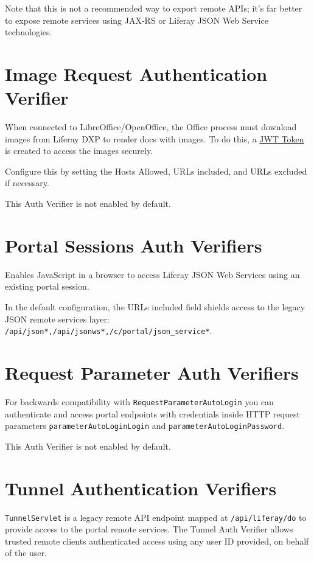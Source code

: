 Note that this is not a recommended way to export remote APIs; it's far
better to expose remote services using JAX-RS or Liferay JSON Web
Service technologies.

\section{Image Request Authentication
Verifier}\label{image-request-authentication-verifier}

When connected to LibreOffice/OpenOffice, the Office process must
download images from Liferay DXP to render docs with images. To do this,
a \href{https://jwt.io}{JWT Token} is created to access the images
securely.

Configure this by setting the Hosts Allowed, URLs included, and URLs
excluded if necessary.

This Auth Verifier is not enabled by default.

\section{Portal Sessions Auth
Verifiers}\label{portal-sessions-auth-verifiers}

Enables JavaScript in a browser to access Liferay JSON Web Services
using an existing portal session.

In the default configuration, the URLs included field shields access to
the legacy JSON remote services layer:
\texttt{/api/json*,/api/jsonws*,/c/portal/json\_service*}.

\section{Request Parameter Auth
Verifiers}\label{request-parameter-auth-verifiers}

For backwards compatibility with \texttt{RequestParameterAutoLogin} you
can authenticate and access portal endpoints with credentials inside
HTTP request parameters \texttt{parameterAutoLoginLogin} and
\texttt{parameterAutoLoginPassword}.

This Auth Verifier is not enabled by default.

\section{Tunnel Authentication
Verifiers}\label{tunnel-authentication-verifiers}

\texttt{TunnelServlet} is a legacy remote API endpoint mapped at
\texttt{/api/liferay/do} to provide access to the portal remote
services. The Tunnel Auth Verifier allows trusted remote clients
authenticated access using any user ID provided, on behalf of the user.


